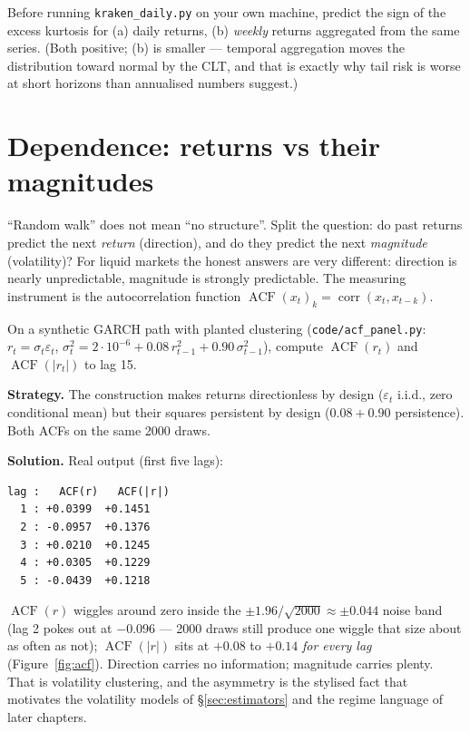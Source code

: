 \begin{checkpoint}
Before running \texttt{kraken\_daily.py} on your own machine, predict
the sign of the excess kurtosis for (a) daily returns, (b)
\emph{weekly} returns aggregated from the same series. (Both positive;
(b) is smaller --- temporal aggregation moves the distribution toward
normal by the CLT, and that is exactly why tail risk is worse at short
horizons than annualised numbers suggest.)
\end{checkpoint}

\section{Dependence: returns vs their magnitudes}\label{sec:dependence}
``Random walk'' does not mean ``no structure''. Split the question:
do past returns predict the next \emph{return} (direction), and do
they predict the next \emph{magnitude} (volatility)? For liquid
markets the honest answers are very different: direction is nearly
unpredictable, magnitude is strongly predictable. The measuring
instrument is the autocorrelation function
$\operatorname{ACF}(x_t)_k = \operatorname{corr}(x_t,x_{t-k})$.

\begin{example}
\label{ex:acf}
On a synthetic GARCH path with planted clustering
(\texttt{code/acf\_panel.py}: $r_t=\sigma_t\varepsilon_t$,
$\sigma_t^2 = 2{\cdot}10^{-6} + 0.08\,r_{t-1}^2 + 0.90\,\sigma_{t-1}^2$),
compute $\operatorname{ACF}(r_t)$ and $\operatorname{ACF}(|r_t|)$ to
lag 15.

\textbf{Strategy.} The construction makes returns directionless by
design ($\varepsilon_t$ i.i.d., zero conditional mean) but their
squares persistent by design ($0.08+0.90$ persistence). Both ACFs on
the same 2000 draws.

\textbf{Solution.} Real output (first five lags):
\begin{lstlisting}[numbers=none]
lag :   ACF(r)   ACF(|r|)
  1 : +0.0399  +0.1451
  2 : -0.0957  +0.1376
  3 : +0.0210  +0.1245
  4 : +0.0305  +0.1229
  5 : -0.0439  +0.1218
\end{lstlisting}
$\operatorname{ACF}(r)$ wiggles around zero inside the
$\pm1.96/\sqrt{2000}\approx\pm0.044$ noise band (lag 2 pokes out at
$-0.096$ --- 2000 draws still produce one wiggle that size about as
often as not); $\operatorname{ACF}(|r|)$ sits at $+0.08$ to $+0.14$
\emph{for every lag} (Figure~\ref{fig:acf}). Direction carries no
information; magnitude carries plenty. That is volatility
clustering, and the asymmetry is the stylised fact that motivates the
volatility models of \S\ref{sec:estimators} and the regime language
of later chapters.
\end{example}

